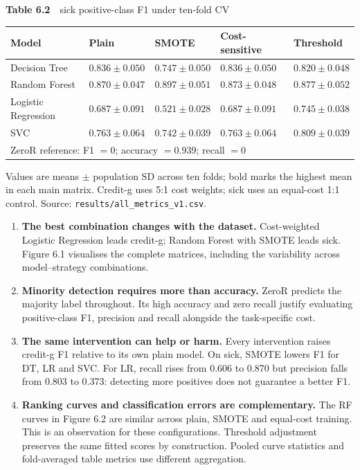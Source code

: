 \begin{center}
\begin{minipage}{\textwidth}
\centering
{\footnotesize\textbf{Table 6.2}\ \ sick positive-class F1 under ten-fold CV}

\footnotesize
\begin{tabular}{p{1.35in}p{0.95in}p{0.95in}p{0.95in}p{0.95in}}
\toprule
Model & Plain & SMOTE & Cost-sensitive & Threshold \\
\midrule
Decision Tree & $0.836 \pm 0.050$ & $0.747 \pm 0.050$ & $0.836 \pm 0.050$ & $0.820 \pm 0.048$ \\
Random Forest & $0.870 \pm 0.047$ & $\mathbf{0.897 \pm 0.051}$ & $0.873 \pm 0.048$ & $0.877 \pm 0.052$ \\
Logistic Regression & $0.687 \pm 0.091$ & $0.521 \pm 0.028$ & $0.687 \pm 0.091$ & $0.745 \pm 0.038$ \\
SVC & $0.763 \pm 0.064$ & $0.742 \pm 0.039$ & $0.763 \pm 0.064$ & $0.809 \pm 0.039$ \\
\midrule
\multicolumn{5}{l}{ZeroR reference: F1 $=0$; accuracy $=0.939$; recall $=0$} \\
\bottomrule
\end{tabular}
\end{minipage}
\end{center}

Values are means $\pm$ population SD across ten folds; bold marks the
highest mean in each main matrix. Credit-g uses 5:1 cost weights; sick uses an
equal-cost 1:1 control. Source: \texttt{results/all\_metrics\_v1.csv}.

\begin{enumerate}
\item \textbf{The best combination changes with the dataset.} Cost-weighted Logistic
Regression leads credit-g; Random Forest with SMOTE leads sick. Figure 6.1 visualises
the complete matrices, including the variability across model--strategy combinations.
\item \textbf{Minority detection requires more than accuracy.} ZeroR predicts the
majority label throughout. Its high accuracy and zero recall justify evaluating
positive-class F1, precision and recall alongside the task-specific cost.
\item \textbf{The same intervention can help or harm.} Every intervention raises
credit-g F1 relative to its own plain model. On sick, SMOTE lowers F1 for DT, LR and
SVC. For LR, recall rises from 0.606 to 0.870 but precision falls from 0.803 to 0.373:
detecting more positives does not guarantee a better F1.
\item \textbf{Ranking curves and classification errors are complementary.} The RF
curves in Figure 6.2 are similar across plain, SMOTE and equal-cost training. This is
an observation for these configurations. Threshold adjustment preserves the same
fitted scores by construction. Pooled curve statistics and fold-averaged table
metrics use different aggregation.
\end{enumerate}


